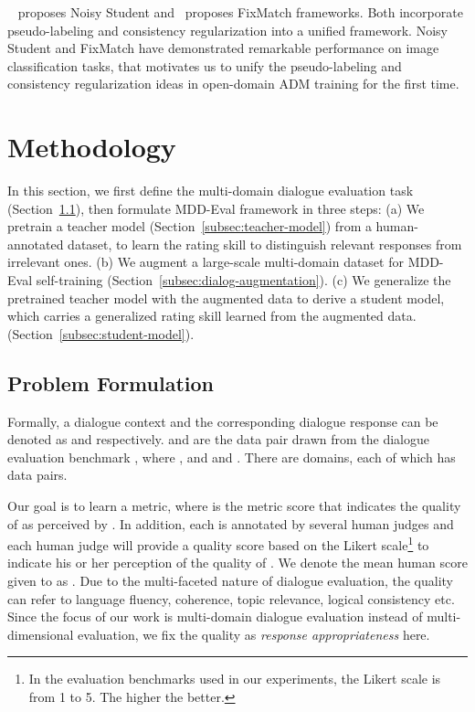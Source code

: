 \documentclass[letterpaper]{article} \usepackage{aaai22}  \usepackage{times}  \usepackage{helvet}  \usepackage{courier}  \usepackage[hyphens]{url}  \usepackage{graphicx} \urlstyle{rm} \def\UrlFont{\rm}  \usepackage{natbib}  \usepackage{caption} \DeclareCaptionStyle{ruled}{labelfont=normalfont,labelsep=colon,strut=off} \frenchspacing  \setlength{\pdfpagewidth}{8.5in}  \setlength{\pdfpageheight}{11in}  \usepackage{algorithm}
\begin{document}
~\citet{xie2020self} proposes Noisy Student and~\citet{sohn2020fixmatch} proposes FixMatch frameworks. Both incorporate pseudo-labeling and consistency regularization into a unified framework.  Noisy Student and FixMatch have demonstrated remarkable performance on image classification tasks, that motivates us to unify the pseudo-labeling and consistency regularization ideas in open-domain ADM training for the first time.















\section{Methodology}
\label{sec:method}
In this section, we first define the multi-domain dialogue evaluation task (Section~\ref{subsec:problem-formulation}), then formulate MDD-Eval framework in three steps: (a) We pretrain a teacher model (Section~\ref{subsec:teacher-model}) from a human-annotated dataset, to learn the rating skill to distinguish relevant responses from irrelevant ones. (b) We augment a large-scale multi-domain dataset for MDD-Eval self-training (Section~\ref{subsec:dialog-augmentation}). (c) We generalize the pretrained teacher model with the augmented data to derive a student model, which carries a generalized rating skill learned from the augmented data. (Section~\ref{subsec:student-model}). 

\subsection{Problem Formulation}
\label{subsec:problem-formulation}
Formally, a dialogue context and the corresponding dialogue response can be denoted as  and  respectively.  and  are the  data pair drawn from the  dialogue evaluation benchmark , where , and  and . There are  domains, each of which has  data pairs. 



Our goal is to learn a metric,  where  is the metric score that indicates the quality of  as perceived by . In addition, each  is annotated by several human judges and each human judge will provide a quality score based on the Likert scale\footnote{In the evaluation benchmarks used in our experiments, the Likert scale is from 1 to 5. The higher the better.} to indicate his or her perception of the quality of . We denote the mean human score given to  as . Due to the multi-faceted nature of dialogue evaluation, the quality can refer to language fluency, coherence, topic relevance, logical consistency etc. Since the focus of our work is multi-domain dialogue evaluation instead of multi-dimensional evaluation, we fix the quality as \textit{response appropriateness} here. 
\end{document}
